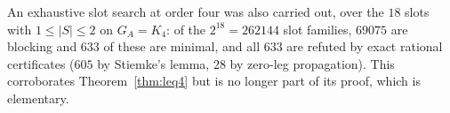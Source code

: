 \documentclass[11pt]{article}
\theoremstyle{plain}
\theoremstyle{definition}
\begin{document}
\begin{humanblock}
An exhaustive slot search at order four was also carried out, over the $18$ slots with
$1\le|S|\le2$ on $G_A=K_4$: of the $2^{18}=262144$ slot families, $69075$ are blocking and $633$
of these are minimal, and all $633$ are refuted by exact rational certificates ($605$ by Stiemke's
lemma, $28$ by zero-leg propagation). This corroborates Theorem~\ref{thm:leq4} but is no longer
part of its proof, which is elementary.
\end{humanblock}



\end{document}

